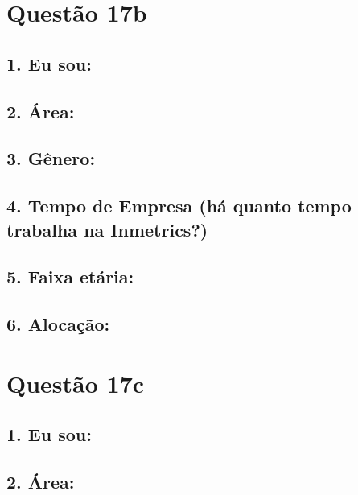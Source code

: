 \documentclass[]{book}
\begin{document}
\hypertarget{questao-17b}{%
\section{Questão 17b}\label{questao-17b}}

\hypertarget{eu-sou-36}{%
\subsection{1. Eu sou:}\label{eu-sou-36}}

\hypertarget{area-36}{%
\subsection{2. Área:}\label{area-36}}

\hypertarget{genero-36}{%
\subsection{3. Gênero:}\label{genero-36}}

\hypertarget{tempo-de-empresa-ha-quanto-tempo-trabalha-na-inmetrics-36}{%
\subsection{4. Tempo de Empresa (há quanto tempo trabalha na Inmetrics?)}\label{tempo-de-empresa-ha-quanto-tempo-trabalha-na-inmetrics-36}}

\hypertarget{faixa-etaria-36}{%
\subsection{5. Faixa etária:}\label{faixa-etaria-36}}

\hypertarget{alocacao-36}{%
\subsection{6. Alocação:}\label{alocacao-36}}

\hypertarget{questao-17c}{%
\section{Questão 17c}\label{questao-17c}}

\hypertarget{eu-sou-37}{%
\subsection{1. Eu sou:}\label{eu-sou-37}}

\hypertarget{area-37}{%
\subsection{2. Área:}\label{area-37}}
\end{document}
